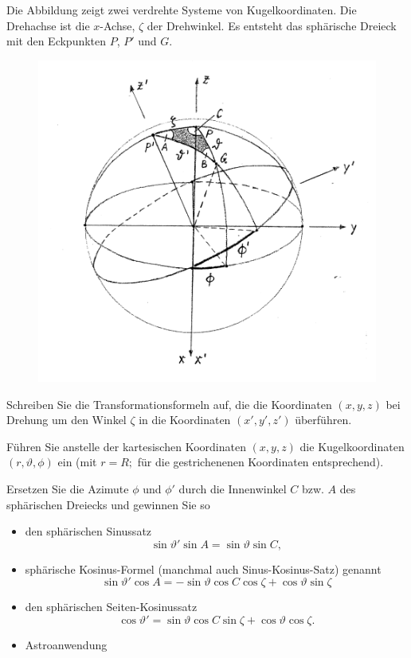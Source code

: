 \begin{atiTask}[
  title = Sphärische Trigonometrie
]

Die Abbildung zeigt zwei verdrehte Systeme von Kugelkoordinaten. Die Drehachse ist die $x$-Achse, $\zeta$ der Drehwinkel. Es entsteht das sphärische Dreieck mit den Eckpunkten $P$, $P'$ und $G$.

\begin{figure}[H]
  \centering
  \includegraphics[width=0.6\linewidth]{./Trigonometrie}
  \label{fig:Trigonometrie}
\end{figure}


\begin{atiSubtasks}
\item Schreiben Sie die Transformationsformeln auf, die die Koordinaten $(x,y,z)$ bei Drehung um den Winkel $\zeta$ in die Koordinaten $(x',y',z')$ überführen.
\item Führen Sie anstelle der kartesischen Koordinaten $(x,y,z)$ die Kugelkoordinaten $(r,\vartheta,\phi)$ ein (mit $r=R;$ für die gestrichenenen Koordinaten entsprechend).
\item Ersetzen Sie die Azimute $\phi$ und $\phi'$ durch die Innenwinkel $C$ bzw. $A$ des sphärischen Dreiecks und gewinnen Sie so
\begin{itemize}
\item den sphärischen Sinussatz
\[
\sin\vartheta'\sin A=\sin \vartheta \sin C,
\]
\item sphärische Kosinus-Formel (manchmal auch Sinus-Kosinus-Satz) genannt
\[
\sin \vartheta'\cos A=-\sin \vartheta \cos C\cos \zeta+\cos \vartheta\sin \zeta
\]
\item den sphärischen Seiten-Kosinussatz
\[
\cos \vartheta'=\sin\vartheta \cos C\sin\zeta+\cos \vartheta\cos \zeta.
\]
\item Astroanwendung
\end{itemize}
\end{atiSubtasks}
\end{atiTask}
